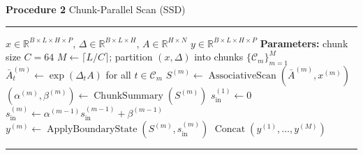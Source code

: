 \documentclass[varwidth=190mm,border=8pt]{standalone}
\begin{document}
\begin{minipage}{180mm}
\small
\noindent\textbf{Procedure 2} Chunk-Parallel Scan (SSD)\par
\vspace{2pt}\hrule\vspace{4pt}
\begin{algorithmic}[1]
\Require $x \in \mathbb{R}^{B\times L\times H\times P}$, $\Delta \in \mathbb{R}^{B\times L\times H}$, $A \in \mathbb{R}^{H\times N}$
\Ensure $y \in \mathbb{R}^{B\times L\times H\times P}$
\Statex \textbf{Parameters:} chunk size $C = 64$
\State $M \gets \lceil L / C \rceil$; partition $(x, \Delta)$ into chunks $\{\mathcal{C}_m\}_{m=1}^{M}$
  \State $\bar{A}^{(m)}_t \gets \exp(\Delta_t A)$ for all $t \in \mathcal{C}_m$
  \State $S^{(m)} \gets \operatorname{AssociativeScan}(\bar{A}^{(m)}, x^{(m)})$
  \State $(\alpha^{(m)}, \beta^{(m)}) \gets \operatorname{ChunkSummary}(S^{(m)})$
\EndFor
\State $s^{(1)}_{\mathrm{in}} \gets 0$
    \State $s^{(m)}_{\mathrm{in}} \gets \alpha^{(m-1)} s^{(m-1)}_{\mathrm{in}} + \beta^{(m-1)}$
  \EndIf
  \State $y^{(m)} \gets \operatorname{ApplyBoundaryState}(S^{(m)}, s^{(m)}_{\mathrm{in}})$
\EndFor
\State \Return $\operatorname{Concat}(y^{(1)}, \dots, y^{(M)})$
\end{algorithmic}
\vspace{4pt}\hrule
\end{minipage}
\end{document}
